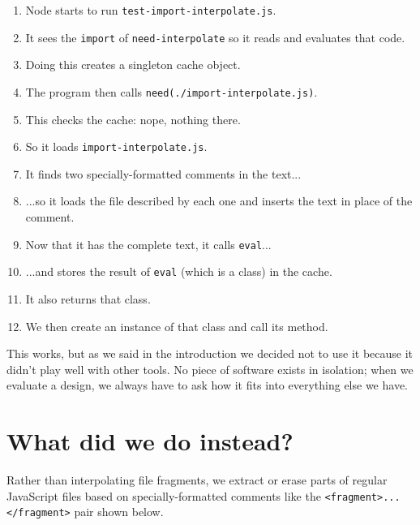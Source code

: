 \documentclass[krantzl]{krantz}
\begin{document}
\begin{enumerate}

\item Node starts to run \texttt{test-import-interpolate.js}.

\item It sees the \texttt{import} of \texttt{need-interpolate} so it reads and evaluates that code.

\item Doing this creates a singleton cache object.

\item The program then calls \texttt{need({\textquotesingle}./import-interpolate.js{\textquotesingle})}.

\item This checks the cache: nope, nothing there.

\item So it loads \texttt{import-interpolate.js}.

\item It finds two specially-formatted comments in the text...

\item ...so it loads the file described by each one and inserts the text in place of the comment.

\item Now that it has the complete text, it calls \texttt{eval}...

\item ...and stores the result of \texttt{eval} (which is a class) in the cache.

\item It also returns that class.

\item We then create an instance of that class and call its method.

\end{enumerate}


\noindent This works,
but as we said in the introduction we decided not to use it
because it didn’t play well with other tools.
No piece of software exists in isolation;
when we evaluate a design,
we always have to ask how it fits into everything else we have.

\section{What did we do instead?}\label{file-interpolator-instead}


Rather than interpolating file fragments,
we extract or erase parts of regular JavaScript files
based on specially-formatted comments
like the \texttt{<fragment>...</fragment>} pair shown below.
\end{document}

